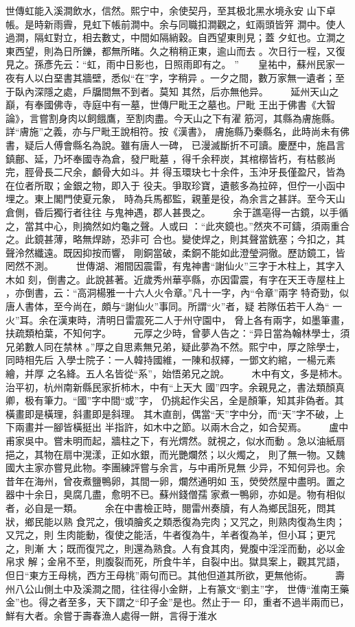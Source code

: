 \documentclass{ctexart}
\begin{document}
世傳虹能入溪澗飲水，信然。熙宁中，余使契丹，至其极北黑水境永安 山下卓帳。是時新雨霽，見虹下帳前澗中。余与同職扣澗觀之，虹兩頭皆笄 澗中。使人過澗，隔虹對立，相去數丈，中間如隔綃穀。自西望東則見；蓋 夕虹也。立澗之東西望，則為日所鑠，都無所睹。久之稍稍正東，逾山而去 。次日行一程，又復見之。孫彥先云：``虹，雨中日影也，日照雨即有之。 ''　　皇祐中，蘇州民家一夜有人以白堊書其牆壁，悉似``在''字，字稍异 。一夕之間，數万家無一遺者；至于臥內深隱之處，戶牖間無不到者。莫知 其然，后亦無他异。 　　延州天山之巔，有奉國佛寺，寺庭中有一墓，世傳尸毗王之墓也。尸毗 王出于佛書《大智論》，言嘗割身肉以飼餓鷹，至割肉盡。今天山之下有濯 筋河，其縣為膚施縣。詳``膚施''之義，亦与尸毗王說相符。按《漢書》， 膚施縣乃秦縣名，此時尚未有佛書，疑后人傅會縣名為說。雖有唐人一碑， 已漫滅斷折不可讀。慶歷中，施昌言鎮鄜、延，乃坏奉國寺為倉，發尸毗墓 ，得千余秤炭，其棺槨皆朽，有枯骸尚完，脛骨長二尺余，顱骨大如斗。并 得玉環玦七十余件，玉沖牙長僅盈尺，皆為在位者所取；金銀之物，即入于 役夫。爭取珍寶，遺骸多為拉碎，但佇一小函中埋之。東上閣門使夏元象， 時為兵馬都監，親董是役，為余言之甚詳。至今天山倉側，昏后獨行者往往 与鬼神遇，郡人甚畏之。 　　余于譙亳得一古鏡，以手循之，當其中心，則摘然如灼龜之聲。人或曰 ：``此夾鏡也。''然夾不可鑄，須兩重合之。此鏡甚薄，略無焊跡，恐非可 合也。變使焊之，則其聲當銑塞；今扣之，其聲泠然纖遠。既因抑按而響， 剛銅當破，柔銅不能如此澄瑩洞徹。歷訪鏡工，皆罔然不測。 　　世傳湖、湘間因震雷，有鬼神書``謝仙火''三字于木柱上，其字入木如 刻，倒書之。此說甚著。近歲秀州華亭縣，亦因雷震，有字在天王寺屋柱上 ，亦倒書，云：``高洞楊雅一十六人火令章。''凡十一字，內``令章''兩字 特奇勁，似唐人書体，至今尚在，頗与``謝仙火''事同。所謂``火''者，疑 若隊伍若干人為`` 一火''耳。余在漢東時，清明日雷震死二人于州守園中， 脅上各有兩字，如墨筆畫，扶疏類柏葉，不知何字。 　　元厚之少時，曾夢人告之：``异日當為翰林學士，須兄弟數人同在禁林 。''厚之自思素無兄弟，疑此夢為不然。熙宁中，厚之除學士，同時相先后 入學士院子：一人韓持國維，一陳和叔繹，一鄧文約綰，一楊元素繪，并厚 之名絳。五人名皆從``系''，始悟弟兄之說。 　　木中有文，多是柿木。治平初，杭州南新縣民家折柿木，中有``上天大 國''四字。余親見之，書法類顏真卿，极有筆力。``國''字中間``或''字， 仍挑起作尖呂，全是顏筆，知其非偽者。其橫畫即是橫理，斜畫即是斜理。 其木直剖，偶當``天''字中分，而``天''字不破，上下兩畫并一腳皆橫挺出 半指許，如木中之節。以兩木合之，如合契焉。 　　盧中甫家吳中。嘗未明而起，牆柱之下，有光煟然。就視之，似水而動 。急以油紙扇挹之，其物在扇中滉漾，正如水銀，而光艷爛然；以火燭之， 則了無一物。又魏國大主家亦嘗見此物。李團練評嘗与余言，与中甫所見無 少异，不知何异也。余昔年在海州，曾夜煮鹽鴨卵，其間一卵，爛然通明如 玉，熒熒然屋中盡明。置之器中十余日，臭腐几盡，愈明不已。蘇州錢僧孺 家煮一鴨卵，亦如是。物有相似者，必自是一類。 　　余在中書檢正時，閱雷州奏牘，有人為鄉民詛死，問其狀，鄉民能以熟 食咒之，俄頃膾炙之類悉復為完肉；又咒之，則熟肉復為生肉；又咒之，則 生肉能動，復使之能活，牛者復為牛，羊者復為羊，但小耳；更咒之，則漸 大；既而復咒之，則還為熟食。人有食其肉，覺腹中淫淫而動，必以金帛求 解；金帛不至，則腹裂而死，所食牛羊，自裂中出。獄具案上，觀其咒語， 但日``東方王母桃，西方王母桃''兩句而已。其他但道其所欲，更無他術。 　　壽州八公山側土中及溪澗之間，往往得小金餅，上有篆文``劉主''字， 世傳``淮南王藥金''也。得之者至多，天下謂之``印子金''是也。然止于一 印，重者不過半兩而已，鮮有大者。余嘗于壽春漁人處得一餅，言得于淮水 
\end{document}
